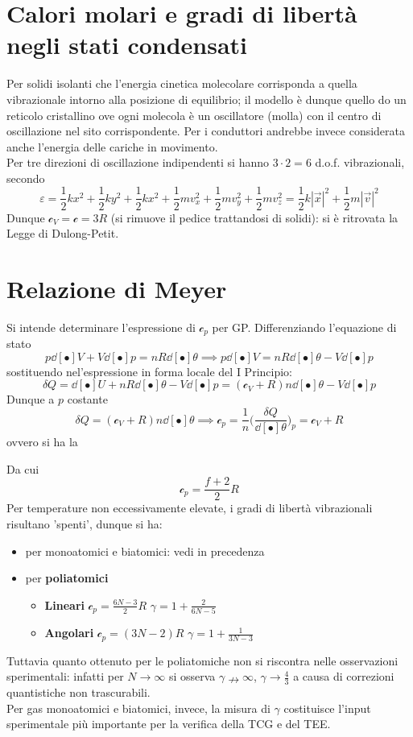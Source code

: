 \documentclass[10pt, oneside]{book}
\newcommand{\lawbox}[2]{\begin{center}
\framebox{
\parbox{\linewidth}{
\vspace{0.3cm}
\textbf{#1} \hfill $\displaystyle #2$
\vspace{0.3cm}
}
}
\end{center}}
\newcommand{\ds}{\displaystyle}
\newcommand{\molhtv}{\mathcal{c}_V }
\newcommand{\molhtp}{\mathcal{c}_p }
\begin{document}
\section{Calori molari e gradi di libertà negli stati condensati}
Per solidi isolanti che l'energia cinetica molecolare corrisponda a quella vibrazionale intorno alla posizione di equilibrio; il modello è dunque quello do un reticolo cristallino ove ogni molecola è un oscillatore (molla) con il centro di oscillazione nel sito corrispondente. Per i conduttori andrebbe invece considerata anche l'energia delle cariche in movimento.\\
Per tre direzioni di oscillazione indipendenti si hanno $3 \cdot 2 = 6$ d.o.f. vibrazionali, secondo
\[\varepsilon = \frac{1}{2}kx^2 + \frac{1}{2}ky^2 + \frac{1}{2}kx^2 + \frac{1}{2}mv_x^2 +  \frac{1}{2}mv_y^2 +  \frac{1}{2}mv_z^2 = \frac{1}{2}k |\vec{x}|^2 + \frac{1}{2}m |\vec{v}|^2\]
Dunque $\ds \molhtv = \mathcal{c} = 3R$ (si rimuove il pedice trattandosi di solidi): si è ritrovata la Legge di Dulong-Petit.

\section{Relazione di Meyer}
Si intende determinare l'espressione di $\molhtp$ per GP. Differenziando l'equazione di stato
\[p \dd[•]{V} + V \dd[•]{p} = nR\dd[•]{\theta} \implies p \dd[•]{V} = nR \dd[•]{\theta} - V \dd[•]{p}\]
sostituendo nel'espressione in forma locale del I Principio:
\[\delta Q = \dd[•]{U} + nR \dd[•]{\theta} - V \dd[•]{p} = (\molhtv + R) n \dd[•]{\theta} - V\dd[•]{p}\]
Dunque a $p$ costante 
\[\delta Q = (\molhtv + R) n \dd[•]{\theta} \implies \molhtp = \frac{1}{n}\bigg(\frac{\delta Q}{\dd[•]{\theta}}\bigg)_{p} = \molhtv + R\]
ovvero si ha la
\lawbox{Relazione di Meyer}{\molhtp = \molhtv + R}
Da cui
\[\boxed{\molhtp = \frac{f + 2}{2} R}\]
Per temperature non eccessivamente elevate, i gradi di libertà vibrazionali risultano 'spenti', dunque si ha:
\begin{itemize}
\item per monoatomici e biatomici: vedi in precedenza
\item per \textbf{poliatomici} \begin{itemize}
\item \textbf{Lineari} $\ds \molhtp = \frac{6N - 3}{2}R$ \quad \bigg\rangle \quad $\ds \gamma = 1 + \frac{2}{6N - 5}$ 
\item \textbf{Angolari} $\ds \molhtp = (3N-2) R$ \quad \bigg\rangle \quad $\ds \gamma = 1 + \frac{1}{3N - 3}$ 
\end{itemize}
\end{itemize}
Tuttavia quanto ottenuto per le poliatomiche non si riscontra nelle osservazioni sperimentali: infatti per $N \rightarrow \infty$ si osserva $\gamma \nrightarrow \infty$, $\ds \gamma \rightarrow \frac{4}{3}$ a causa di correzioni quantistiche non trascurabili.\\
Per gas monoatomici e biatomici, invece, la misura di $\gamma$ costituisce l'input sperimentale più importante per la verifica della TCG e del TEE.
\end{document}
